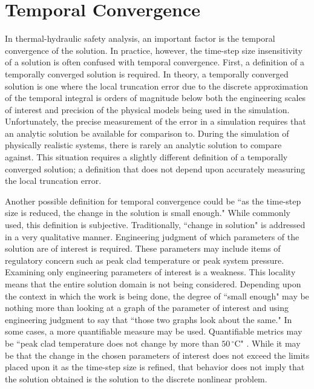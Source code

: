 \section{Temporal Convergence}
\label{sect:temporal_convergence}

In thermal-hydraulic safety analysis, an important factor is the temporal convergence of the solution.
In practice, however, the time-step size insensitivity of a solution is often confused with temporal convergence.
First, a definition of a temporally converged solution is required.
In theory, a temporally converged solution is one where the local truncation error due to the discrete approximation of the temporal integral is orders of magnitude below both the engineering scales of interest and precision of the physical models being used in the simulation.
Unfortunately, the precise measurement of the error in a simulation requires that an analytic solution be available for comparison to.
During the simulation of physically realistic systems, there is rarely an analytic solution to compare against.
This situation requires a slightly different definition of a temporally converged solution; a definition that does not depend upon accurately measuring the local truncation error.

Another possible definition for temporal convergence could be ``as the time-step size is reduced, the change in the solution is small enough."
While commonly used, this definition is subjective.
Traditionally, ``change in solution" is addressed in a very qualitative manner.
Engineering judgment of which parameters of the solution are of interest is required.
These parameters may include items of regulatory concern such as peak clad temperature or peak system pressure.
Examining only engineering parameters of interest is a weakness.
This locality means that the entire solution domain is not being considered.
Depending upon the context in which the work is being done, the degree of ``small enough" may be nothing more than looking at a graph of the parameter of interest and using engineering judgment to say that ``those two graphs look about the same."
In some cases, a more quantifiable measure may be used.
Quantifiable metrics may be  ``peak clad temperature does not change by more than $50\,^{\circ}\mathrm{C}$" \cite{CFR10}.
While it may be that the change in the chosen parameters of interest does not exceed the limits placed upon it as the time-step size is refined, that behavior does not imply that the solution obtained is the solution to the discrete nonlinear problem.

